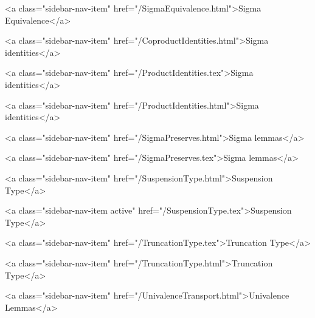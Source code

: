       
    
      
        
          <a class="sidebar-nav-item" href="/SigmaEquivalence.html">Sigma Equivalence</a>
        
      
    
      
        
          <a class="sidebar-nav-item" href="/CoproductIdentities.html">Sigma identities</a>
        
      
    
      
        
          <a class="sidebar-nav-item" href="/ProductIdentities.tex">Sigma identities</a>
        
      
    
      
        
          <a class="sidebar-nav-item" href="/ProductIdentities.html">Sigma identities</a>
        
      
    
      
        
          <a class="sidebar-nav-item" href="/SigmaPreserves.html">Sigma lemmas</a>
        
      
    
      
        
          <a class="sidebar-nav-item" href="/SigmaPreserves.tex">Sigma lemmas</a>
        
      
    
      
        
          <a class="sidebar-nav-item" href="/SuspensionType.html">Suspension Type</a>
        
      
    
      
        
          <a class="sidebar-nav-item active" href="/SuspensionType.tex">Suspension Type</a>
        
      
    
      
        
          <a class="sidebar-nav-item" href="/TruncationType.tex">Truncation Type</a>
        
      
    
      
        
          <a class="sidebar-nav-item" href="/TruncationType.html">Truncation Type</a>
        
      
    
      
        
          <a class="sidebar-nav-item" href="/UnivalenceTransport.html">Univalence Lemmas</a>
        
